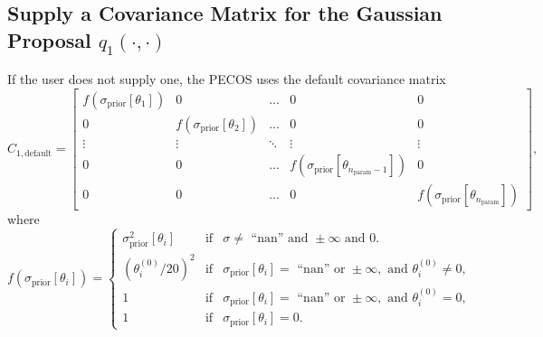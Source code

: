 \subsection{Supply a Covariance Matrix for the Gaussian Proposal $q_1(\cdot,\cdot)$}\label{subsc-gmc-eight-steps-proposal-cov-matrix-for-q1}

If the user does not supply one, the PECOS uses the default covariance matrix
\begin{equation}\label{eq-default-C1-cov-matrix}
C_{1,\text{default}} =
\left[
\begin{array}{cccccc}
f(\sigma_{\text{prior}}[\theta_1]) & 0                                  & \ldots & 0                                                   & 0      \\
0                                  & f(\sigma_{\text{prior}}[\theta_2]) & \ldots & 0                                                   & 0      \\
\vdots                             & \vdots                             & \ddots & \vdots                                              & \vdots \\
0                                  & 0                                  & \ldots & f(\sigma_{\text{prior}}[\theta_{n_{\text{param}}-1}]) & 0      \\
0                                  & 0                                  & \ldots & 0                                                   & f(\sigma_{\text{prior}}[\theta_{n_{\text{param}}}])
\end{array}
\right],
\end{equation}
where
\begin{equation*}
f(\sigma_{\text{prior}}[\theta_i]) =
\left\{
\begin{array}{rcl}
\sigma_{\text{prior}}^2[\theta_i] & \text{if} & \sigma\neq\text{ ``nan''}\text{ and }\pm\infty\text{ and }0.\\
(\theta_i^{(0)}/20)^2             & \text{if} & \sigma_{\text{prior}}[\theta_i] = \text{ ``nan''}\text{ or }\pm\infty,\text{ and }\theta_i^{(0)}\neq 0,\\
1                                 & \text{if} & \sigma_{\text{prior}}[\theta_i] = \text{ ``nan''}\text{ or }\pm\infty,\text{ and }\theta_i^{(0)} = 0,\\
1                                 & \text{if} & \sigma_{\text{prior}}[\theta_i] = 0.
\end{array}
\right.
\end{equation*}

